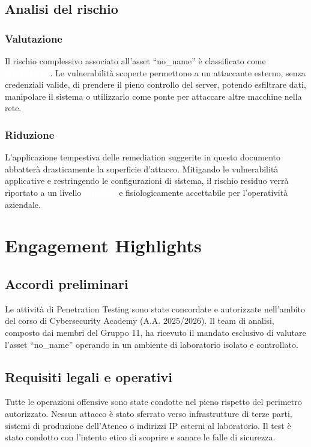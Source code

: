 \documentclass[11pt]{article}
\newcommand{\sev}[2]{%
  \setlength{\fboxsep}{3pt}%
  \colorbox{#1}{\textcolor{white}{\small\textbf{#2}}}%
}
\newcommand{\sevCRIT}{\sev{sevCritico}{CRITICO}}
\newcommand{\sevLOW}{\sev{sevBasso}{BASSO}}
\begin{document}
\subsection{Analisi del rischio}
\subsubsection{Valutazione}
Il rischio complessivo associato all'asset ``no\_name'' è classificato come \sevCRIT. Le vulnerabilità scoperte permettono a un attaccante esterno, senza credenziali valide, di prendere il pieno controllo del server, potendo esfiltrare dati, manipolare il sistema o utilizzarlo come ponte per attaccare altre macchine nella rete.

\subsubsection{Riduzione}
L'applicazione tempestiva delle remediation suggerite in questo documento abbatterà drasticamente la superficie d'attacco. Mitigando le vulnerabilità applicative e restringendo le configurazioni di sistema, il rischio residuo verrà riportato a un livello \sevLOW e fisiologicamente accettabile per l'operatività aziendale.


\section{Engagement Highlights}

\subsection{Accordi preliminari}
Le attività di Penetration Testing sono state concordate e autorizzate nell'ambito del corso di Cybersecurity Academy (A.A. 2025/2026). Il team di analisi, composto dai membri del Gruppo 11, ha ricevuto il mandato esclusivo di valutare l'asset ``no\_name'' operando in un ambiente di laboratorio isolato e controllato.

\subsection{Requisiti legali e operativi}
Tutte le operazioni offensive sono state condotte nel pieno rispetto del perimetro autorizzato. Nessun attacco è stato sferrato verso infrastrutture di terze parti, sistemi di produzione dell'Ateneo o indirizzi IP esterni al laboratorio. Il test è stato condotto con l'intento etico di scoprire e sanare le falle di sicurezza.
\end{document}
